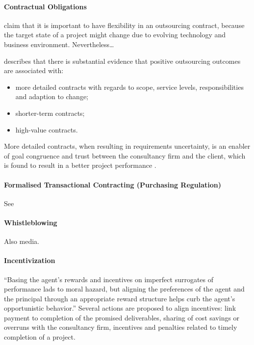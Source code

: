 \documentclass[12pt]{article}
\providecommand{\tightlist}{%
  \setlength{\itemsep}{0pt}\setlength{\parskip}{0pt}}
\begin{document}
\hypertarget{contractual-obligations}{%
\paragraph{Contractual Obligations}\label{contractual-obligations}}

\citet{mcfarlan1995} claim that it is important to have flexibility in
an outsourcing contract, because the target state of a project might
change due to evolving technology and business environment.
Nevertheless\ldots{}

\citet[4]{lacity2012} describes that there is substantial evidence that
positive outsourcing outcomes are associated with:

\begin{itemize}
\tightlist
\item
  more detailed contracts with regards to scope, service levels,
  responsibilities and adaption to change;
\item
  shorter-term contracts;
\item
  high-value contracts.
\end{itemize}

More detailed contracts, when resulting in requirements uncertainty, is
an enabler of goal congruence and trust between the consultancy firm and
the client, which is found to result in a better project performance
\citep{liberatore264}.

\hypertarget{formalised-transactional-contracting-purchasing-regulation}{%
\paragraph{Formalised Transactional Contracting (Purchasing
Regulation)}\label{formalised-transactional-contracting-purchasing-regulation}}

See \citet[4-5]{sturdy2021}

\hypertarget{whistleblowing}{%
\paragraph{Whistleblowing}\label{whistleblowing}}

Also media.

\hypertarget{incentivization}{%
\paragraph{Incentivization}\label{incentivization}}

``Basing the agent's rewards and incentives on imperfect surrogates of
performance lads to moral hazard, but aligning the preferences of the
agent and the principal through an appropriate reward structure helps
curb the agent's opportunistic behavior.'' \citep[ 13-15]{basu2011}
Several actions are proposed to align incentives: link payment to
completion of the promised deliverables, sharing of cost savings or
overruns with the consultancy firm, incentives and penalties related to
timely completion of a project.
\end{document}

